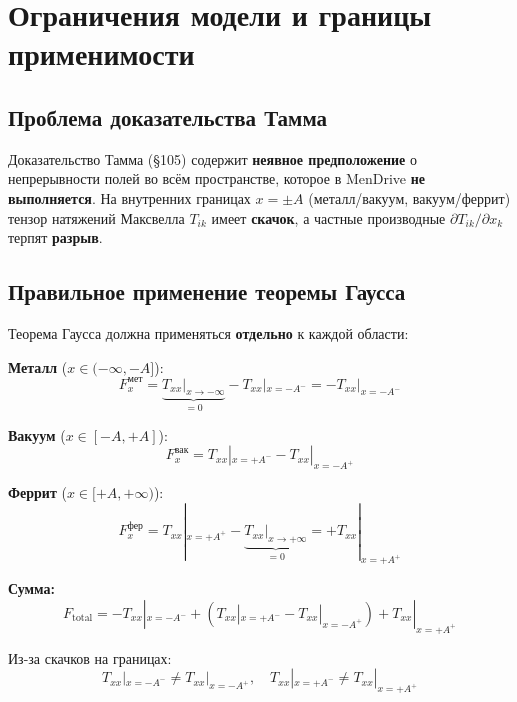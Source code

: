 \documentclass[a4paper,12pt]{article}
\begin{document}
{\section{Ограничения модели и границы применимости}

\subsection{Проблема доказательства Тамма}

Доказательство Тамма (\S 105) содержит \textbf{неявное предположение} о 
непрерывности полей во всём пространстве, которое в MenDrive 
\textbf{не выполняется}. На внутренних границах $x = \pm A$ (металл/вакуум, 
вакуум/феррит) тензор натяжений Максвелла $T_{ik}$ имеет \textbf{скачок}, 
а частные производные $\partial T_{ik}/\partial x_k$ терпят 
\textbf{разрыв}.

\subsection{Правильное применение теоремы Гаусса}

Теорема Гаусса должна применяться \textbf{отдельно} к каждой области:

\textbf{Металл} ($x \in (-\infty, -A]$):
\begin{equation}
F_x^{\text{мет}} = \underbrace{T_{xx}|_{x \to -\infty}}_{=0} 
- T_{xx}|_{x=-A^-} = -T_{xx}|_{x=-A^-}
\end{equation}

\textbf{Вакуум} ($x \in [-A, +A]$):
\begin{equation}
F_x^{\text{вак}} = T_{xx}|_{x=+A^-} - T_{xx}|_{x=-A^+}
\end{equation}

\textbf{Феррит} ($x \in [+A, +\infty)$):
\begin{equation}
F_x^{\text{фер}} = T_{xx}|_{x=+A^+} 
- \underbrace{T_{xx}|_{x \to +\infty}}_{=0} = +T_{xx}|_{x=+A^+}
\end{equation}

\textbf{Сумма:}
\begin{equation}
F_{\text{total}} = -T_{xx}|_{x=-A^-} + (T_{xx}|_{x=+A^-} - T_{xx}|_{x=-A^+}) 
+ T_{xx}|_{x=+A^+}
\end{equation}

Из-за скачков на границах:
\begin{equation}
T_{xx}|_{x=-A^-} \neq T_{xx}|_{x=-A^+}, \quad 
T_{xx}|_{x=+A^-} \neq T_{xx}|_{x=+A^+}
\end{equation}

}
\end{document}
